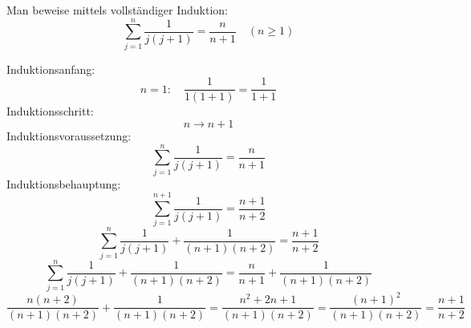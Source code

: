\documentclass[a4paper, margins=3cm]{homework}
\begin{document}
\begin{problem}
	Man beweise mittels vollständiger Induktion:
	\[ \sum_{j=1}^n \frac{1}{j(j+1)} = \frac{n}{n+1} \quad (n \geq 1)\]
\end{problem}
\begin{solution}
	Induktionsanfang: \[n = 1:\quad \frac{1}{1(1+1)} = \frac{1}{1+1} \]
	Induktionsschritt: \[n \rightarrow n+1\]
	Induktionsvoraussetzung: \[ \sum_{j=1}^n \frac{1}{j(j+1)} = \frac{n}{n+1} \]
	Induktionsbehauptung: \[ \sum_{j=1}^{n+1} \frac{1}{j(j+1)} = \frac{n+1}{n+2} \]
	\[ \sum_{j=1}^n \frac{1}{j(j+1)} + \frac{1}{(n+1)(n+2)} = \frac{n+1}{n+2} \]
	\[ \sum_{j=1}^n \frac{1}{j(j+1)} + \frac{1}{(n+1)(n+2)} = \frac{n}{n+1} + \frac{1}{(n+1)(n+2)} \]
	\[ \frac{n(n+2)}{(n+1)(n+2)} + \frac{1}{(n+1)(n+2)} = \frac{n^2+2n+1}{(n+1)(n+2)} = \frac{(n+1)^2}{(n+1)(n+2)} = \frac{n+1}{n+2} \]
\end{solution}
\end{document}
